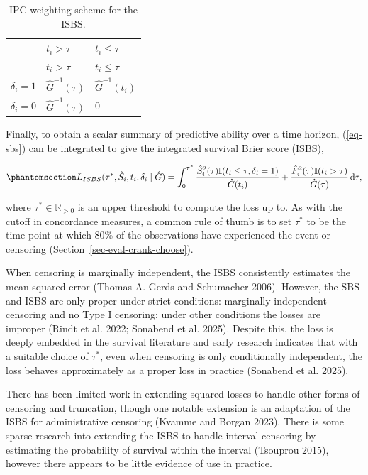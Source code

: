 \documentclass[
  letterpaper,
  krantz2]{style/krantz}
\begin{document}
\begin{longtable}[]{@{}lll@{}}
\caption{IPC weighting scheme for the
ISBS.}\label{tbl-ipcw-weights}\tabularnewline
\toprule\noalign{}
& \(t_i > \tau\) & \(t_i \leq \tau\) \\
\midrule\noalign{}
\endfirsthead
\toprule\noalign{}
& \(t_i > \tau\) & \(t_i \leq \tau\) \\
\midrule\noalign{}
\endhead
\bottomrule\noalign{}
\endlastfoot
\(\delta_i = 1\) & \(\hat{G}^{-1}(\tau)\) & \(\hat{G}^{-1}(t_i)\) \\
\(\delta_i = 0\) & \(\hat{G}^{-1}(\tau)\) & \(0\) \\
\end{longtable}

Finally, to obtain a scalar summary of predictive ability over a time
horizon, (\ref{eq-sbs}) can be integrated to give the integrated
survival Brier score (ISBS),

\begin{equation}\phantomsection\label{eq-igs}{
L_{ISBS}(\tau^*, \hat{S}_i, t_i, \delta_i \mid \hat{G}) = \int^{\tau^*}_0  \frac{\hat{S}_i^2(\tau) \mathbb{I}(t_i \leq \tau, \delta_i=1)}{\hat{G}(t_i)} + \frac{\hat{F}_i^2(\tau) \mathbb{I}(t_i > \tau)}{\hat{G}(\tau)} \,\mathrm{d}\tau,
}\end{equation}

where \(\tau^* \in \mathbb{R}_{>0}\) is an upper threshold to compute
the loss up to. As with the cutoff in concordance measures, a common
rule of thumb is to set \(\tau^*\) to be the time point at which 80\% of
the observations have experienced the event or censoring
(Section~\ref{sec-eval-crank-choose}).

When censoring is marginally independent, the ISBS consistently
estimates the mean squared error (Thomas A.
Gerds and Schumacher 2006). However, the SBS and ISBS are only proper
under strict conditions: marginally independent censoring and no Type I
censoring; under other conditions the losses are improper (Rindt et al.
2022; Sonabend et al. 2025). Despite this, the loss is deeply embedded
in the survival literature and early research indicates that with a
suitable choice of \(\tau^*\), even when censoring is only conditionally
independent, the loss behaves approximately as a proper loss in practice
(Sonabend et al. 2025).

There has been limited work in extending squared losses to handle other
forms of censoring and truncation, though one notable extension is an
adaptation of the ISBS for administrative censoring (Kvamme and Borgan
2023). There is some sparse research into extending the ISBS to handle
interval censoring by estimating the probability of survival within the
interval (Tsouprou 2015), however there appears to be little evidence of
use in practice.
\end{document}
